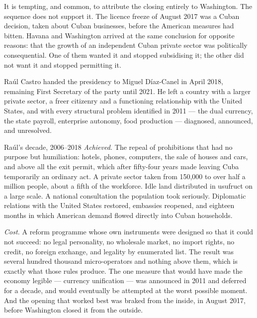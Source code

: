 It is tempting, and common, to attribute the closing entirely to Washington. The
sequence does not support it. The licence freeze of August 2017 was a Cuban
decision, taken about Cuban businesses, before the American measures had bitten.
Havana and Washington arrived at the same conclusion for opposite reasons:
that the growth of an independent Cuban private sector was politically
consequential. One of them wanted it and stopped subsidising it; the other did
not want it and stopped permitting it.

Ra\'ul Castro handed the presidency to Miguel D\'iaz-Canel in April 2018,
remaining First Secretary of the party until 2021. He left a country with a
larger private sector, a freer citizenry and a functioning relationship with the
United States, and with every structural problem identified in 2011 --- the dual
currency, the state payroll, enterprise autonomy, food production ---
diagnosed, announced, and unresolved.

\begin{ledger}{Ra\'ul's decade, 2006--2018}
\emph{Achieved.} The repeal of prohibitions that had no purpose but humiliation:
hotels, phones, computers, the sale of houses and cars, and above all the exit
permit, which after fifty-four years made leaving Cuba temporarily an ordinary
act. A private sector taken from 150,000 to over half a million people, about a
fifth of the workforce. Idle land distributed in usufruct on a large scale. A
national consultation the population took seriously. Diplomatic relations with
the United States restored, embassies reopened, and eighteen months in which
American demand flowed directly into Cuban households.

\emph{Cost.} A reform programme whose own instruments were designed so that it
could not succeed: no legal personality, no wholesale market, no import rights,
no credit, no foreign exchange, and legality by enumerated list. The result was
several hundred thousand micro-operators and nothing above them, which is
exactly what those rules produce. The one measure that would have made the
economy legible --- currency unification --- was announced in 2011 and deferred
for a decade, and would eventually be attempted at the worst possible moment.
And the opening that worked best was braked from the inside, in August 2017,
before Washington closed it from the outside.
\end{ledger}
